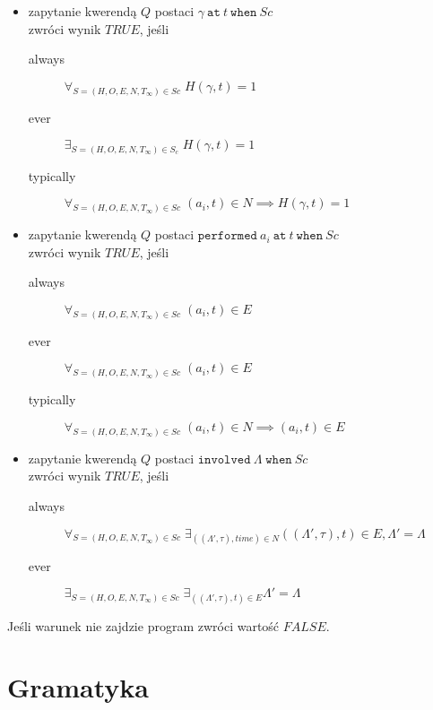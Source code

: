 \begin{itemize}
	\item zapytanie kwerendą $Q$ postaci $\gamma\ \texttt{at}\ t\ \texttt{when}\ Sc$\\ zwróci wynik $TRUE$, jeśli\\
	\begin{description}
		\item[always] $\forall_{S=(H,O,E,N,T_{\infty}) \in Sc}\; H(\gamma,t)=1$
		\item[ever] $\exists_{S=(H,O,E,N,T_{\infty}) \in S_c}\; H(\gamma,t)=1$
		\item[typically] $\forall_{S=(H,O,E,N,T_{\infty}) \in Sc}\; (a_i, t) \in N \implies H(\gamma,t)=1$
	\end{description}
	\item zapytanie kwerendą $Q$ postaci $\texttt{performed}\ a_i\ \texttt{at}\ t\ \texttt{when}\ Sc$\\
	zwróci wynik $TRUE$, jeśli
	\begin{description}
		\item[always] $\forall_{S=(H,O,E,N,T_{\infty}) \in Sc}\; (a_i,t) \in E$
		\item[ever] $\forall_{S=(H,O,E,N,T_{\infty}) \in Sc}\; (a_i,t) \in E$
		\item[typically] $\forall_{S=(H,O,E,N,T_{\infty}) \in Sc}\; (a_i,t) \in N \implies (a_i,t) \in E$
	\end{description}
	\item zapytanie kwerendą $Q$ postaci $\texttt{involved}\ \Lambda \; \texttt{when}\ Sc$\\ zwróci wynik $TRUE$, jeśli
	\begin{description}
		\item[always] $\forall_{S=(H,O,E,N,T_{\infty}) \in Sc}\; \exists_{((\Lambda', \tau), time) \in N} ((\Lambda', \tau),t) \in E, \Lambda' = \Lambda$
		\item[ever] $\exists_{S=(H,O,E,N,T_{\infty}) \in Sc}\; \exists_{((\Lambda', \tau),t) \in E} \Lambda' = \Lambda$
	\end{description}
\end{itemize}

\begin{remark}
   Jeśli warunek nie zajdzie program zwróci wartość $FALSE$.
\end{remark}
\section{Gramatyka}


\begin{example}~\\

\end{example}


